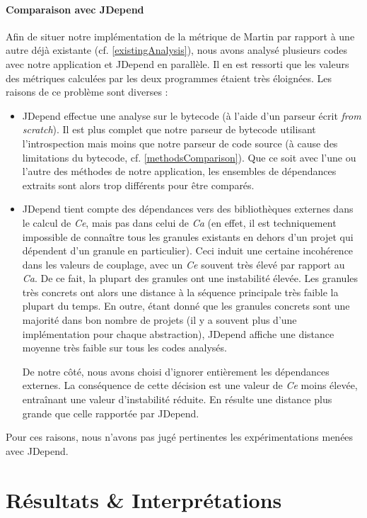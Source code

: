 \documentclass{scrartcl}
\begin{document}
    \paragraph{Comparaison avec JDepend} Afin de situer notre implémentation de la métrique de Martin par rapport à une autre déjà existante (cf. \ref{existingAnalysis}), nous avons analysé plusieurs codes avec notre application et JDepend en parallèle. Il en est ressorti que les valeurs des métriques calculées par les deux programmes étaient très éloignées. Les raisons de ce problème sont diverses :
    \begin{itemize}
        \item JDepend effectue une analyse sur le bytecode (à l'aide d'un parseur écrit \textit{from scratch}). Il est plus complet que notre parseur de bytecode utilisant l'introspection mais moins que notre parseur de code source (à cause des limitations du bytecode, cf. \ref{methodsComparison}). Que ce soit avec l'une ou l'autre des méthodes de notre application, les ensembles de dépendances extraits sont alors trop différents pour être comparés.
        \item JDepend tient compte des dépendances vers des bibliothèques externes dans le calcul de \emph{Ce}, mais pas dans celui de \emph{Ca} (en effet, il est techniquement impossible de connaître tous les granules existants en dehors d'un projet qui dépendent d'un granule en particulier). Ceci induit une certaine incohérence dans les valeurs de couplage, avec un \emph{Ce} souvent très élevé par rapport au \emph{Ca}. De ce fait, la plupart des granules ont une instabilité élevée. Les granules très concrets ont alors une distance à la séquence principale très faible la plupart du temps. En outre, étant donné que les granules concrets sont une majorité dans bon nombre de projets (il y a souvent plus d'une implémentation pour chaque abstraction), JDepend affiche une distance moyenne très faible sur tous les codes analysés. 
        
        De notre côté, nous avons choisi d'ignorer entièrement les dépendances externes. La conséquence de cette décision est une valeur de \emph{Ce} moins élevée, entraînant une valeur d'instabilité réduite. En résulte une distance plus grande que celle rapportée par JDepend.
    \end{itemize}
    Pour ces raisons, nous n'avons pas jugé pertinentes les expérimentations menées avec JDepend.

\newpage
\section{Résultats \& Interprétations}
\end{document}
